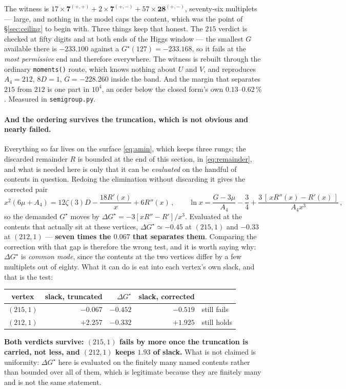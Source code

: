 \documentclass[11pt,a4paper]{article}
\newcommand{\rep}[1]{\mathbf{#1}}
\begin{document}
\noindent The witness is
$17\times\rep7^{(+,+)}+2\times\rep7^{(+,-)}+57\times\rep{28}^{(+,-)}$, seventy-six multiplets ---
large, and nothing in the model caps the content, which was the point of \S\ref{sec:ceiling} to
begin with. Three things keep that honest. The $215$ verdict is checked at fifty digits and at both
ends of the Higgs window --- the smallest $G$ available there is $-233.100$ against a
$G^\star(127)=-233.168$, so it fails at the \emph{most permissive} end and therefore everywhere.
The witness is rebuilt through the ordinary \texttt{moments()} route, which knows nothing about $U$
and $V$, and reproduces $A_4=212$, $8D=1$, $G=-228.260$ inside the band. And the margin that
separates $215$ from $212$ is one part in $10^{4}$, an order below the closed form's own
$0.13$--$0.62\,\%$. Measured in \texttt{semigroup.py}.

\paragraph{And the ordering survives the truncation, which is not obvious and nearly failed.}
Everything so far lives on the surface \eqref{eq:amin}, which keeps three rungs; the discarded
remainder $R$ is bounded at the end of this section, in \eqref{eq:remainder}, and what is needed
here is only that it can be \emph{evaluated} on the handful of contents in question. Redoing the
elimination without discarding it gives the corrected pair
\begin{equation}\label{eq:corrected}
  x^2(6\mu+A_4)=12\zeta(3)D-\frac{18R'(x)}{x}+6R''(x)\,,\qquad
  \ln x=\frac{G-3\mu}{A_4}-\frac34+\frac{3\,[\,xR''(x)-R'(x)\,]}{A_4x^3}\,,
\end{equation}
so the demanded $G^\star$ moves by $\Delta G^\star=-3[xR''-R']/x^3$. Evaluated at the contents that
actually sit at these vertices, $\Delta G^\star\simeq-0.45$ at $(215,1)$ and $-0.33$ at $(212,1)$
--- \textbf{seven times the $0.067$ that separates them}. Comparing the correction with that gap is
therefore the wrong test, and it is worth saying why: $\Delta G^\star$ is \emph{common mode}, since
the contents at the two vertices differ by a few multiplets out of eighty. What it can do is eat
into each vertex's own slack, and that is the test:
\begin{center}\small
\begin{tabular}{crrrl}
\toprule
\rowcolor{hdrblue!10}vertex & slack, truncated & $\Delta G^\star$ & slack, corrected & \\
\midrule
\rowcolor{warmred!14}$(215,1)$ & $-0.067$ & $-0.452$ & $-0.519$ & still fails\\
$(212,1)$ & $+2.257$ & $-0.332$ & $+1.925$ & still holds\\
\bottomrule
\end{tabular}
\end{center}
\noindent \textbf{Both verdicts survive: $(215,1)$ fails by more once the truncation is carried, not
less, and $(212,1)$ keeps $1.93$ of slack.} What is not claimed is uniformity: $\Delta G^\star$ here
is evaluated on the finitely many named contents rather than bounded over all of them, which is
legitimate because they are finitely many and is not the same statement.
\end{document}

